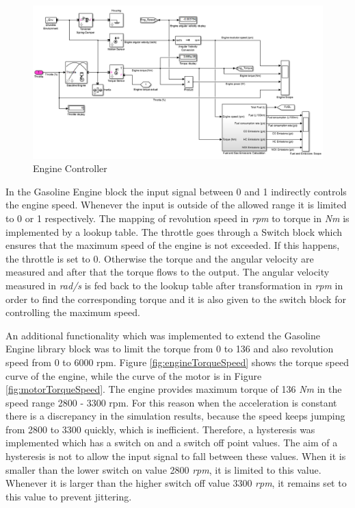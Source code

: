 \begin{figure}[h]
\centering
\includegraphics[scale=0.51]{figures/hev/enginecontroller}
\caption{Engine Controller}
\label{fig:enginecontroller}
\end{figure}

In the Gasoline Engine block the input signal between 0 and 1 indirectly controls the engine speed. Whenever the input is outside of the allowed range it is limited to 0 or 1 respectively. The mapping of revolution speed in \textit{rpm} to torque in \textit{Nm} is implemented by a lookup table. The throttle goes through a Switch block which ensures that the maximum speed of the engine is not exceeded. If this happens, the throttle is set to 0. Otherwise the torque and the angular velocity are measured and after that the torque flows to the output. The angular velocity measured in \textit{rad/s} is fed back to the lookup table after transformation in \textit{rpm} in order to find the corresponding torque and it is also given to the switch block for controlling the maximum speed.

An additional functionality which was implemented to extend the Gasoline Engine library block was to limit the torque from 0 to 136 and also revolution speed from 0 to 6000 rpm. Figure \ref{fig:engineTorqueSpeed} shows the torque speed curve of the engine, while the curve of the motor is in Figure \ref{fig:motorTorqueSpeed}. The engine provides maximum torque of 136 \textit{Nm} in the speed range 2800 - 3300 rpm. For this reason when the acceleration is constant there is a discrepancy in the simulation results, because the speed keeps jumping from 2800 to 3300 quickly, which is inefficient. Therefore, a hysteresis was implemented which has a switch on and a switch off point values. The aim of a hysteresis is not to allow the input signal to fall between these values. When it is smaller than the lower switch on value 2800 \textit{rpm}, it is limited to this value. Whenever it is larger than the higher switch off value 3300 \textit{rpm}, it remains set to this value to prevent jittering. 

